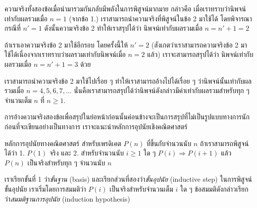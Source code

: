 ความจริง{\wbr}ทั้ง{\wbr}สอง{\wbr}ข้อ{\wbr}เมื่อ{\wbr}นำมา{\wbr}รวม{\wbr}กัน{\wbr}กลับ{\wbr}มี{\wbr}พลัง{\wbr}ใน{\wbr}การ{\wbr}พิสูจน์{\wbr}มากมาย กล่าวคือ{\wbr}
เมื่อ{\wbr}เรา{\wbr}ทราบ{\wbr}ว่า{\wbr}นิพจน์{\wbr}เท่า{\wbr}กับ{\wbr}ผลรวม{\wbr}เมื่อ $ n=1 $ (จาก{\wbr}ข้อ 1.)
เรา{\wbr}สามารถ{\wbr}นำ{\wbr}ความจริง{\wbr}ที่{\wbr}พิสูจน์{\wbr}ใน{\wbr}ข้อ 2 มา{\wbr}ใช้ได้ โดย{\wbr}พิจารณา{\wbr}กรณี{\wbr}ที่ $ n'=1 $
ดังนั้น{\wbr}ความจริง{\wbr}ข้อ 2 ทำ{\wbr}ให้{\wbr}เรา{\wbr}สรุป{\wbr}ได้{\wbr}ว่า นิพจน์{\wbr}เท่า{\wbr}กับ{\wbr}ผลรวม{\wbr}เมื่อ $ n=n'+1=2 $

ถ้า{\wbr}เรา{\wbr}เอา{\wbr}ความจริง{\wbr}ข้อ 2 มา{\wbr}ใช้{\wbr}อีก{\wbr}รอบ โดย{\wbr}ครั้งนี้{\wbr}ให้ $ n'=2 $
(สังเกต{\wbr}ว่า{\wbr}เรา{\wbr}สามารถ{\wbr}ความจริง{\wbr}ข้อ 2 มา{\wbr}ใช้ได้{\wbr}เนื่องจาก{\wbr}เรา{\wbr}ทราบ{\wbr}ว่า{\wbr}ผลรวม{\wbr}เท่า{\wbr}กับ{\wbr}นิพจน์{\wbr}เมื่อ $
n=2 $ แล้ว) เรา{\wbr}จะ{\wbr}สามารถ{\wbr}สรุป{\wbr}ได้{\wbr}ว่า นิพจน์{\wbr}เท่า{\wbr}กับ{\wbr}ผลรวม{\wbr}เมื่อ $ n=n'+1=3 $ ด้วย{\wbr}

เรา{\wbr}สามารถ{\wbr}นำ{\wbr}ความจริง{\wbr}ข้อ 2 มา{\wbr}ใช้{\wbr}ไป{\wbr}เรื่อย ๆ ทำ{\wbr}ให้{\wbr}เรา{\wbr}สามารถ{\wbr}อ้าง{\wbr}ไป{\wbr}ได้{\wbr}เรื่อย ๆ
ว่า{\wbr}นิพจน์{\wbr}นั้น{\wbr}เท่า{\wbr}กับ{\wbr}ผลรวม{\wbr}เมื่อ $ n=4,5,6,7,\ldots $
นั่น{\wbr}คือ{\wbr}เรา{\wbr}สามารถ{\wbr}สรุป{\wbr}ได้{\wbr}ว่า{\wbr}นิพจน์{\wbr}ดังกล่าว{\wbr}มี{\wbr}ค่า{\wbr}เท่า{\wbr}กับ{\wbr}ผลรวม{\wbr}สำหรับ{\wbr}ทุก ๆ จำนวนเต็ม $ n $ ที่{\wbr}
$ n\geq 1 $.

การ{\wbr}อ้าง{\wbr}ความจริง{\wbr}สอง{\wbr}ข้อ{\wbr}เพื่อ{\wbr}สรุป{\wbr}ใน{\wbr}ย่อหน้า{\wbr}ก่อน{\wbr}นั้น{\wbr}ค่อนข้าง{\wbr}จะ{\wbr}เป็น{\wbr}การ{\wbr}สรุป{\wbr}ที่{\wbr}ไม่{\wbr}เป็น{\wbr}รูปแบบ{\wbr}ทางการ{\wbr}นัก ก่อน{\wbr}ที่{\wbr}จะ{\wbr}เขียน{\wbr}อย่าง{\wbr}เป็นทางการ เรา{\wbr}จะ{\wbr}แนะนำ{\wbr}หลักการ{\wbr}อุปนัย{\wbr}เชิง{\wbr}คณิตศาสตร์{\wbr}

    หลักการ{\wbr}อุปนัย{\wbr}ทาง{\wbr}คณิตศาสตร์{\wbr}
    สำหรับ{\wbr}เพรดิเคต $ P(n) $ ที่{\wbr}ขึ้น{\wbr}กับ{\wbr}จำนวนนับ $ n $ ถ้า{\wbr}เรา{\wbr}สามารถ{\wbr}พิสูจน์{\wbr}ได้{\wbr}ว่า{\wbr}
    1. $ P(1) $ จริง และ{\wbr}
    2. สำหรับ{\wbr}จำนวนนับ $ i\geq 1 $ ใด ๆ $ P(i)\Rightarrow P(i+1) $
    แล้ว $ P(n) $ เป็นจริง{\wbr}สำหรับ{\wbr}ทุก ๆ จำนวนนับ $ n $

เรา{\wbr}เรียก{\wbr}ขั้น{\wbr}ที่ 1 ว่า{\em ขั้น{\wbr}ฐาน} (basis) และ{\wbr}เรียก{\wbr}ส่วน{\wbr}ที่{\wbr}สอง{\wbr}ว่า{\em ขั้น{\wbr}อุปนัย}
(inductive step) ใน{\wbr}การ{\wbr}พิสูจน์{\wbr}ขั้น{\wbr}อุปนัย เรา{\wbr}เริ่ม{\wbr}โดย{\wbr}การ{\wbr}สมมติ{\wbr}ว่า $ P(i) $
เป็นจริง{\wbr}สำหรับ{\wbr}จำนวนเต็ม $ i $ ใด ๆ ข้อสมมติ{\wbr}ดังกล่าว{\wbr}เรียก{\wbr}ว่า{\em สมมติฐาน{\wbr}การ{\wbr}อุปนัย}
(induction hypothesis)

